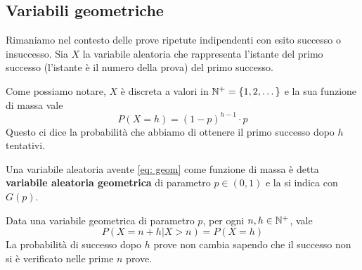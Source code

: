 \subsection{Variabili geometriche}
Rimaniamo nel contesto delle prove ripetute indipendenti con esito successo o insuccesso. Sia $X$
la variabile aleatoria che rappresenta l'istante del primo successo (l'istante è il numero della
prova) del primo successo.

Come possiamo notare, $X$ è discreta a valori in $\mathbb{N}^+ = \{ 1, 2, \dots \}$ e la sua funzione di
massa vale
\begin{equation}\label{eq: geom}
	P(X = h) = (1-p)^{h-1} \cdot p
\end{equation}
Questo ci dice la probabilità che abbiamo di ottenere il primo successo dopo $h$ tentativi.

Una variabile aleatoria avente \ref{eq: geom} come funzione di massa è detta
\textbf{variabile aleatoria geometrica} di parametro $p \in (0,1)$ e la si indica con $G(p)$.

\begin{proposition}
	Data una variabile geometrica di parametro $p$, per ogni $n,h \in \mathbb{N}^+$, vale
	\[ P(X = n + h | X > n) = P(X = h) \]
	La probabilità di successo dopo $h$ prove non cambia sapendo che il successo non si è
	verificato nelle prime $n$ prove.
\end{proposition}